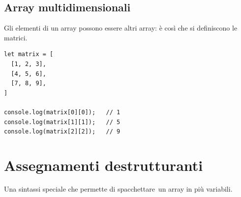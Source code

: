 \subsection{Array multidimensionali}

Gli elementi di un array possono essere altri array: è così che si definiscono
le matrici.

\begin{affianco}[0.55][c]
\begin{lstlisting}[style=js, name=matrice.js]
let matrix = [
  [1, 2, 3],
  [4, 5, 6],
  [7, 8, 9],
]

console.log(matrix[0][0]);   // 1
console.log(matrix[1][1]);   // 5
console.log(matrix[2][2]);   // 9
\end{lstlisting}
\risultato
\begin{immagine}
\end{immagine}
\end{affianco}

\section{Assegnamenti destrutturanti}

Una sintassi speciale che permette di \guillemotleft spacchettare\guillemotright\ un array in più
variabili.

